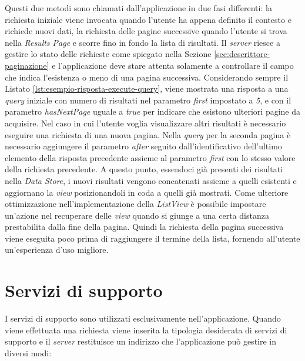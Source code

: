 Questi due metodi sono chiamati dall'applicazione in due fasi differenti: la richiesta iniziale viene invocata quando l'utente ha appena definito il contesto e richiede nuovi dati, la richiesta delle pagine successive quando l'utente si trova nella \emph{Results Page} e scorre fino in fondo la lista di risultati. 
Il \emph{server} riesce a gestire lo stato delle richieste come spiegato nella Sezione \ref{sec:descrittore-paginazione} e l'applicazione deve stare attenta solamente a controllare il campo che indica l'esistenza o meno di una pagina successiva.
Considerando sempre il Listato \ref{lst:esempio-risposta-execute-query}, viene mostrata una risposta a una \emph{query} iniziale con numero di risultati nel parametro \emph{first} impostato a \emph{5}, e con il parametro \emph{hasNextPage} uguale a \emph{true} per indicare che esistono ulteriori pagine da acquisire. Nel caso in cui l'utente voglia visualizzare altri risultati è necessario eseguire una richiesta di una nuova pagina. Nella \emph{query} per la seconda pagina è necessario aggiungere il parametro \emph{after} seguito dall'identificativo dell'ultimo elemento della risposta precedente assieme al parametro \emph{first} con lo stesso valore della richiesta precedente. A questo punto, essendoci già presenti dei risultati nella \emph{Data Store}, i nuovi risultati vengono concatenati assieme a quelli esistenti e aggiornano la \emph{view} posizionandoli in coda a quelli già mostrati. Come ulteriore ottimizzazione nell'implementazione della \emph{ListView} è possibile impostare un'azione nel recuperare delle \emph{view} quando si giunge a una certa distanza prestabilita dalla fine della pagina. Quindi la richiesta della pagina successiva viene eseguita poco prima di raggiungere il termine della lista, fornendo all'utente un'esperienza d'uso migliore.

\section{Servizi di supporto}\label{sec:servizi-supporto-app}

I servizi di supporto sono utilizzati esclusivamente nell'applicazione. Quando viene effettuata una richiesta viene inserita la tipologia desiderata di servizi di supporto e il \emph{server} restituisce un indirizzo che l'applicazione può gestire in diversi modi:

